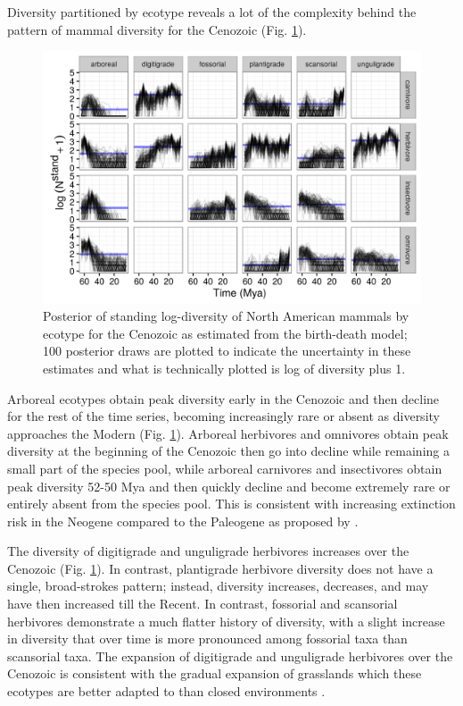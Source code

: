 \documentclass[12pt,letterpaper]{article}
\begin{document}
Diversity partitioned by ecotype reveals a lot of the complexity behind the pattern of mammal diversity for the Cenozoic (Fig. \ref{fig:ecotype_diversity}). 

\begin{figure}[ht]
  \centering
  \includegraphics[width=\textwidth,height=0.4\textheight,keepaspectratio=true]{figure/ecotype_diversity}
  \caption[Estimated mammal ecotype log-diversity for the Cenozoic]{Posterior of standing log-diversity of North American mammals by ecotype for the Cenozoic as estimated from the birth-death model; 100 posterior draws are plotted to indicate the uncertainty in these estimates and what is technically plotted is log of diversity plus 1.}
  \label{fig:ecotype_diversity}
\end{figure}

Arboreal ecotypes obtain peak diversity early in the Cenozoic and then decline for the rest of the time series, becoming increasingly rare or absent as diversity approaches the Modern (Fig. \ref{fig:ecotype_diversity}). Arboreal herbivores and omnivores obtain peak diversity at the beginning of the Cenozoic then go into decline while remaining a small part of the species pool, while arboreal carnivores and insectivores obtain peak diversity 52-50 Mya and then quickly decline and become extremely rare or entirely absent from the species pool. This is consistent with increasing extinction risk in the Neogene compared to the Paleogene as proposed by \citet{Smits2015b}.

The diversity of digitigrade and unguligrade herbivores increases over the Cenozoic (Fig. \ref{fig:ecotype_diversity}). In contrast, plantigrade herbivore diversity does not have a single, broad-strokes pattern; instead, diversity increases, decreases, and may have then increased till the Recent. In contrast, fossorial and scansorial herbivores demonstrate a much flatter history of diversity, with a slight increase in diversity that over time is more pronounced among fossorial taxa than scansorial taxa. The expansion of digitigrade and unguligrade herbivores over the Cenozoic is consistent with the gradual expansion of grasslands which these ecotypes are better adapted to than closed environments \citep{Blois2009,Stromberg2005}.
\end{document}
